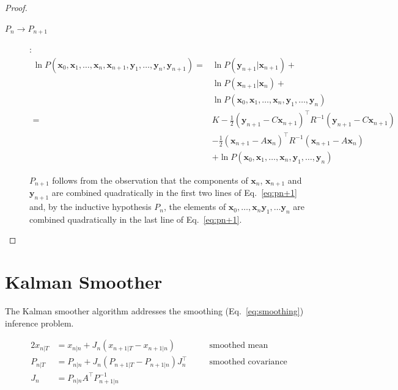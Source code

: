 \documentclass[12pt]{article}
\begin{document}
\begin{proof}
\begin{description}
        \item[$P_n\rightarrow P_{n+1}$]:
            \begin{align}
                \ln P(\mathbf{x}_0, \mathbf{x}_1, \ldots, \mathbf{x}_n, \mathbf{x}_{n+1},\mathbf{y}_1, \ldots, \mathbf{y}_{n}, \mathbf{y}_{n+1})=&\ln P(\mathbf{y}_{n+1}|\mathbf{x}_{n+1})+\nonumber\\
                &\ln P(\mathbf{x}_{n+1}|\mathbf{x}_n)+\nonumber\\
                &\ln P(\mathbf{x}_0,\mathbf{x}_1,\ldots,\mathbf{x}_n,\mathbf{y}_1, \ldots, \mathbf{y}_{n})\nonumber\\
                =&K-\frac{1}{2}(\mathbf{y}_{n+1}-C\mathbf{x}_{n+1})^\intercal R^{-1}(\mathbf{y}_{n+1}-C\mathbf{x}_{n+1})\nonumber\\
                 &-\frac{1}{2}(\mathbf{x}_{n+1}-A\mathbf{x}_{n})^\intercal R^{-1}(\mathbf{x}_{n+1}-A\mathbf{x}_{n})\nonumber\\
                 &+\ln P(\mathbf{x}_0,\mathbf{x}_1,\ldots,\mathbf{x}_n,\mathbf{y}_1, \ldots, \mathbf{y}_{n})\label{eq:pn+1}
            \end{align}

            $P_{n+1}$ follows from the observation that the components of
            $\mathbf{x}_n$, $\mathbf{x}_{n+1}$ and $\mathbf{y}_{n+1}$ are combined
            quadratically in the first two lines of Eq.~\ref{eq:pn+1} and, by
            the inductive hypothesis $P_n$, the elements of
            $\mathbf{x}_0,\ldots,\mathbf{x}_n\mathbf{y}_1,\ldots\mathbf{y}_n$
            are combined quadratically in the last line of Eq.~\ref{eq:pn+1}.

    \end{description}

\end{proof}

\section{Kalman Smoother}

The Kalman smoother algorithm addresses the smoothing (Eq.~\ref{eq:smoothing})
inference problem.

\begin{alignat*}{2}
    x_{n|T}&=x_{n|n}+J_n(x_{n+1|T}-x_{n+1|n})\quad&&\text{smoothed mean}\\
    P_{n|T}&=P_{n|n}+J_n(P_{n+1|T}-P_{n+1|n})J_n^\intercal\quad&&\text{smoothed covariance}\\
    J_n&=P_{n|n}A^\intercal P_{n+1|n}^{-1}&&
\end{alignat*}
\end{document}
